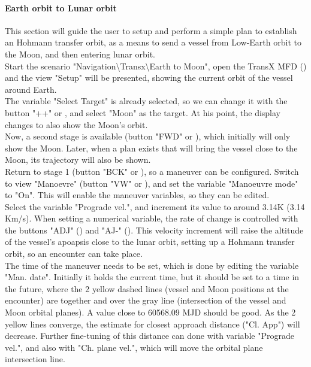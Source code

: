\documentclass[Orbiter User Manual.tex]{subfiles}
\begin{document}
\paragraph{Earth orbit to Lunar orbit}
This section will guide the user to setup and perform a simple plan to establish an Hohmann transfer orbit, as a means to send a vessel from Low-Earth orbit to the Moon, and then entering lunar orbit.\\
Start the scenario "Navigation\textbackslash Transx\textbackslash Earth to Moon", open the TransX MFD (\Shift{}) and the view "Setup" will be presented, showing the current orbit of the vessel around Earth.\\
The variable "Select Target" is already selected, so we can change it with the button "++" or \Shift\keystroke{=}, and select "Moon" as the target. At his point, the display changes to also show the Moon's orbit.\\
Now, a second stage is available (button "FWD" or \Shift{}), which initially will only show the Moon. Later, when a plan exists that will bring the vessel close to the Moon, its trajectory will also be shown.\\
Return to stage 1 (button "BCK" or \Shift{}), so a maneuver can be configured. Switch to view "Manoevre" (button "VW" or \Shift{}), and set the variable "Manoeuvre mode" to "On". This will enable the maneuver variables, so they can be edited.\\
Select the variable "Prograde vel.", and increment its value to around 3.14K (3.14 Km/s). When setting a numerical variable, the rate of change is controlled with the buttons "ADJ" (\Shift\keystroke{\{}) and "AJ-" (\Shift\keystroke{\}}). This velocity increment will raise the altitude of the vessel's apoapsis close to the lunar orbit, setting up a Hohmann transfer orbit, so an encounter can take place.\\
The time of the maneuver needs to be set, which is done by editing the variable "Man. date". Initially it holds the current time, but it should be set to a time in the future, where the 2 yellow dashed lines (vessel and Moon positions at the encounter) are together and over the gray line (intersection of the vessel and Moon orbital planes). A value close to 60568.09 MJD should be good. As the 2 yellow lines converge, the estimate for closest approach distance ("Cl. App") will decrease. Further fine-tuning of this distance can done with variable "Prograde vel.", and also with "Ch. plane vel.", which will move the orbital plane intersection line.\\
\end{document}
